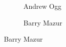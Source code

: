 \begin{frame}[plain]
\begin{figure}[h]
\begin{subfigure}{0.3\textwidth}
	\caption{Andrew Ogg}
	\end{subfigure} \hspace{0.05cm}
	\begin{subfigure}{0.3\textwidth}
	\captionsetup{labelformat=empty}
	\centering
	\caption{Barry Mazur}
	\end{subfigure}
	\end{figure}
\end{frame}




